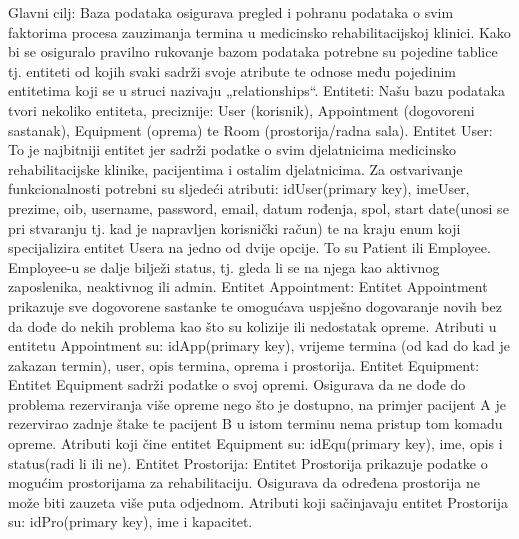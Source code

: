 				
				\hspace*{2em}
				Glavni cilj: Baza podataka osigurava pregled i pohranu podataka o svim faktorima procesa zauzimanja termina u medicinsko rehabilitacijskoj klinici. Kako bi se osiguralo pravilno rukovanje bazom podataka potrebne su pojedine tablice tj. entiteti od kojih svaki sadrži svoje atribute te odnose među pojedinim entitetima koji se u struci nazivaju „relationships“. Entiteti: Našu bazu podataka tvori nekoliko entiteta, preciznije: User (korisnik), Appointment (dogovoreni sastanak), Equipment (oprema) te Room (prostorija/radna sala). 
				\newline
				\hspace*{2em}
				Entitet User: To je najbitniji entitet jer sadrži podatke o svim djelatnicima medicinsko rehabilitacijske klinike, pacijentima i ostalim djelatnicima. Za ostvarivanje funkcionalnosti potrebni su sljedeći atributi: idUser(primary key), imeUser, prezime, oib, username, password, email, datum rođenja, spol, start date(unosi se pri stvaranju tj. kad je napravljen korisnički račun) te na kraju enum koji specijalizira entitet Usera na jedno od dvije opcije. To su Patient ili Employee. Employee-u se dalje bilježi status, tj. gleda li se na njega kao aktivnog zaposlenika, neaktivnog ili admin.
				\newline
				\hspace*{2em}
				Entitet Appointment: Entitet Appointment prikazuje sve dogovorene sastanke te omogućava uspješno dogovaranje novih bez da dođe do nekih problema kao što su kolizije ili nedostatak opreme. Atributi u entitetu Appointment su: idApp(primary key), vrijeme termina (od kad do kad je zakazan termin), user, opis termina, oprema i prostorija. 
				\newline
				\hspace*{2em}
				Entitet Equipment: Entitet Equipment sadrži podatke o svoj opremi. Osigurava da ne dođe do problema rezerviranja više opreme nego što je dostupno, na primjer pacijent A je rezervirao zadnje štake te pacijent B u istom terminu nema pristup tom komadu opreme. Atributi koji čine entitet Equipment su: idEqu(primary key), ime, opis i status(radi li ili ne). 
				\newline
				\hspace*{2em}
				Entitet Prostorija: Entitet Prostorija prikazuje podatke o mogućim prostorijama za rehabilitaciju. Osigurava da određena prostorija ne može biti zauzeta više puta odjednom. Atributi koji sačinjavaju entitet Prostorija su: idPro(primary key), ime i kapacitet. 
